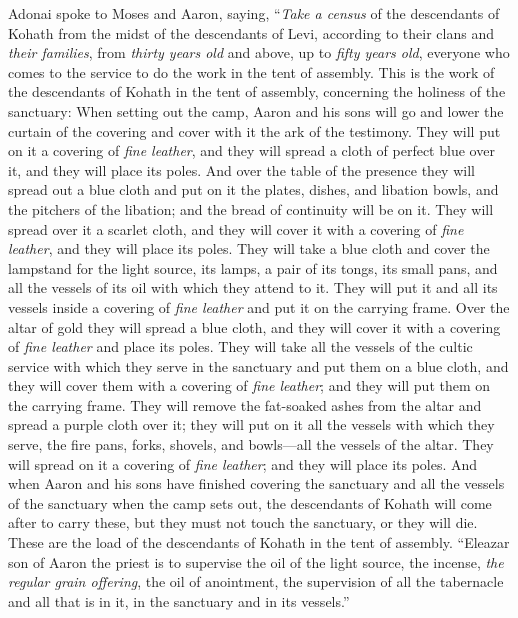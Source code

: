 \begin{biblechapter} %
 Adonai spoke to Moses and Aaron, saying,
\verse “\textit{Take a census} of the descendants of Kohath from the midst of the descendants of Levi, according to their clans and \textit{their families},
\verse from \textit{thirty years old} and above, up to \textit{fifty years old}, everyone who comes to the service to do the work in the tent of assembly.
\verse This is the work of the descendants of Kohath in the tent of assembly, concerning the holiness of the sanctuary:
\verse When setting out the camp, Aaron and his sons will go and lower the curtain of the covering and cover with it the ark of the testimony.
\verse They will put on it a covering of \textit{fine leather}, and they will spread a cloth of perfect blue over it, and they will place its poles.
\verse And over the table of the presence they will spread out a blue cloth and put on it the plates, dishes, and libation bowls, and the pitchers of the libation; and the bread of continuity will be on it.
\verse They will spread over it a scarlet cloth, and they will cover it with a covering of \textit{fine leather}, and they will place its poles.
\verse They will take a blue cloth and cover the lampstand for the light source, its lamps, a pair of its tongs, its small pans, and all the vessels of its oil with which they attend to it.
\verse They will put it and all its vessels inside a covering of \textit{fine leather} and put it on the carrying frame.
\verse Over the altar of gold they will spread a blue cloth, and they will cover it with a covering of \textit{fine leather} and place its poles.
\verse They will take all the vessels of the cultic service with which they serve in the sanctuary and put them on a blue cloth, and they will cover them with a covering of \textit{fine leather}; and they will put them on the carrying frame.
\verse They will remove the fat-soaked ashes from the altar and spread a purple cloth over it;
\verse they will put on it all the vessels with which they serve, the fire pans, forks, shovels, and bowls—all the vessels of the altar. They will spread on it a covering of \textit{fine leather}; and they will place its poles.
\verse And when Aaron and his sons have finished covering the sanctuary and all the vessels of the sanctuary when the camp sets out, the descendants of Kohath will come after to carry these, but they must not touch the sanctuary, or they will die. These are the load of the descendants of Kohath in the tent of assembly.
\verse “Eleazar son of Aaron the priest is to supervise the oil of the light source, the incense, \textit{the regular grain offering}, the oil of anointment, the supervision of all the tabernacle and all that is in it, in the sanctuary and in its vessels.”

\end{biblechapter}
